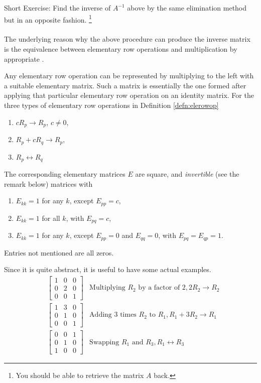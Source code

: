 Short Exercise: Find the inverse of $A^{-1}$ above by the same elimination method but in an opposite fashion. \footnote{You should be able to retrieve the matrix $A$ back.}\\
\\
The underlying reason why the above procedure can produce the inverse matrix is the equivalence between elementary row operations and multiplication by appropriate .
\begin{thm}
\label{thm:elementarymat}
Any elementary row operation can be represented by multiplying to the left with a suitable elementary matrix. Such a matrix is essentially the one formed after applying that particular elementary row operation on an identity matrix. For the three types of elementary row operations in Definition \ref{defn:elerowop}
\begin{enumerate}
\item $cR_{p} \to R_{p}$, $c \neq 0$,
\item $R_{p} + cR_{q} \to R_{p}$,
\item $R_{p} \leftrightarrow R_{q}$
\end{enumerate}
The corresponding elementary matrices $E$ are square, and \textit{invertible} (see the remark below) matrices with
\begin{enumerate}
\item $E_{kk} = 1$ for any $k$, except $E_{pp} = c$,
\item $E_{kk} = 1$ for all $k$, with $E_{pq} = c$,
\item $E_{kk} = 1$ for any $k$, except $E_{pp} = 0$ and $E_{qq} = 0$, with $E_{pq} = E_{qp} = 1$. 
\end{enumerate}
Entries not mentioned are all zeros.
\end{thm}
Since it is quite abstract, it is useful to have some actual examples.
\begin{align*}
&
\begin{bmatrix}
1 & 0 & 0 \\
0 & 2 & 0 \\
0 & 0 & 1
\end{bmatrix} & \text{Multiplying $R_2$ by a factor of $2$}, 2R_2 \to R_2 \\
&
\begin{bmatrix}
1 & 3 & 0 \\
0 & 1 & 0 \\
0 & 0 & 1
\end{bmatrix} & \text{Adding 3 times $R_2$ to $R_1$}, R_1 + 3R_2 \to R_1 \\
&
\begin{bmatrix}
0 & 0 & 1 \\
0 & 1 & 0 \\
1 & 0 & 0
\end{bmatrix} & \text{Swapping $R_1$ and $R_3$}, R_1 \leftrightarrow R_3 
\end{align*}
